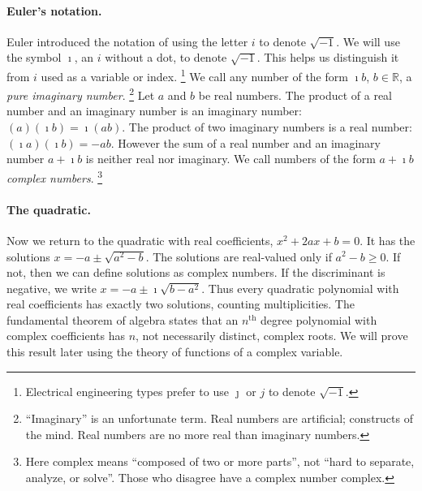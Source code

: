 \paragraph{Euler's notation.}
Euler introduced the notation of using the letter $i$ to denote $\sqrt{-1}$.
We will use the symbol $\imath$, an $i$ without a dot, to denote 
$\sqrt{-1}$.  This helps us distinguish it from $i$ used as a variable or 
index.%
\footnote{
  Electrical engineering types prefer to use $\jmath$ or $j$ to denote
  $\sqrt{-1}$.
  }
We call any number of the form $\imath b$, 
$b \in \mathbb{R}$, a \textit{pure imaginary number}.%
\footnote{
  ``Imaginary'' is an unfortunate term.  Real numbers are 
  artificial; constructs of the mind.  Real numbers are no more real than
  imaginary numbers.
  }
Let $a$ and $b$ be real numbers.  The product of a real number and an 
imaginary number is an imaginary number: $(a)(\imath b) = \imath (a b)$.
The product of two imaginary numbers is a real number: 
$(\imath a)(\imath b) = - a b$.  However the sum of a real number and an 
imaginary number $a + \imath b$ is neither real nor imaginary.
We call numbers of the form $a + \imath b$ \textit{complex numbers}.%
\footnote{
  Here complex means ``composed of two or more parts'', not
  ``hard to separate, analyze, or solve''.  Those who disagree have a 
  complex number complex.
  }


\paragraph{The quadratic.}
Now we return to the quadratic with real coefficients, 
$x^2 + 2 a x + b = 0$.  It has the solutions
$x = -a \pm \sqrt{a^2 - b}$.  The solutions are real-valued
only if $a^2 - b \geq 0$.  If not, then we can define solutions as 
complex numbers.  
If the discriminant is negative, we write
$x = -a \pm \imath \sqrt{b - a^2}$.
Thus every quadratic polynomial with real coefficients has exactly 
two solutions, counting multiplicities.  
The fundamental theorem of algebra states that an $n^{\mathrm{th}}$
degree polynomial with complex coefficients has $n$, not necessarily
distinct, complex roots.  We will prove this result later using the 
theory of functions of a complex variable.





